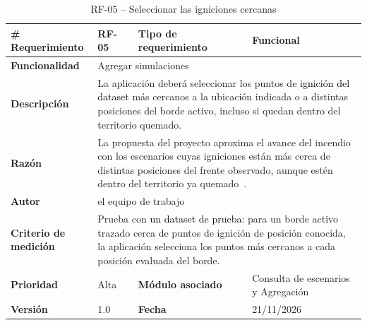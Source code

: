 \begin{longtable}{|p{\rqA}|p{\rqB}|p{\rqC}|p{\rqD}|}
  \caption{RF-05 -- Seleccionar las igniciones cercanas}\label{tab:rf-05}\tabularnewline
  \hline
  \textbf{\# Requerimiento} & RF-05 & \raggedright\textbf{Tipo de requerimiento} & Funcional\tabularnewline\hline
  \raggedright\textbf{Funcionalidad} & \multicolumn{3}{p{\rqBCD}|}{Agregar simulaciones}\tabularnewline\hline
  \endfirsthead
  \textbf{Descripción} & \multicolumn{3}{p{\rqBCD}|}{La aplicación deberá seleccionar los puntos de \textcolor{black}{ignición del dataset} más cercanos a la ubicación indicada o a distintas posiciones del borde activo, incluso si quedan dentro del territorio quemado.}\tabularnewline\hline
  \textbf{Razón} & \multicolumn{3}{p{\rqBCD}|}{La propuesta del proyecto aproxima el avance del incendio con los escenarios cuyas igniciones están más cerca de distintas posiciones del frente observado, aunque estén dentro del territorio ya quemado~\cite{vfp2026}.}\tabularnewline\hline
  \textbf{Autor} & \multicolumn{3}{p{\rqBCD}|}{el equipo de trabajo}\tabularnewline\hline
  \raggedright\textbf{Criterio de medición} & \multicolumn{3}{p{\rqBCD}|}{Prueba con \textcolor{black}{un dataset de prueba}: para un borde activo trazado cerca de puntos de ignición de posición conocida, la aplicación selecciona los puntos más cercanos a cada posición evaluada del borde.}\tabularnewline\hline
  \textbf{Prioridad} & Alta & \raggedright\textbf{Módulo asociado} & Consulta de escenarios y Agregación\tabularnewline\hline
  \textbf{Versión} & 1.0 & \textbf{Fecha} & 21/11/2026\tabularnewline\hline
\end{longtable}

